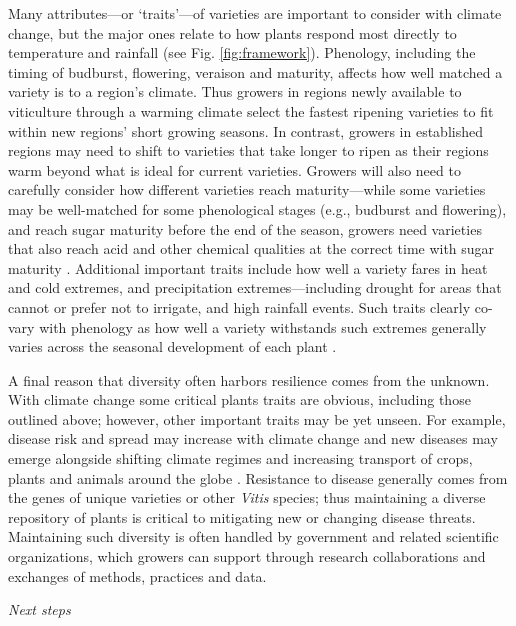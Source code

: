\documentclass[11pt,letterpaper]{article}
\begin{document}
Many attributes---or `traits'---of varieties are important to consider with climate change, but the major ones relate to how plants respond most directly to temperature and rainfall (see Fig. \ref{fig:framework}). Phenology, including the timing of budburst, flowering, veraison and maturity, affects how well matched a variety is to a region's climate. Thus growers in regions newly available to viticulture through a warming climate select the fastest ripening varieties to fit within new regions' short growing seasons. In contrast, growers in established regions may need to shift to varieties that take longer to ripen as their regions warm beyond what is ideal for current varieties. Growers will also need to carefully consider how different varieties reach maturity---while some varieties may be well-matched for some phenological stages (e.g., budburst and flowering), and reach sugar maturity before the end of the season, growers need varieties that also reach acid and other chemical qualities at the correct time with sugar maturity \citep{rienth2016,torregrosa2017,arriz2018}. Additional important traits include how well a variety fares in heat and cold extremes, and precipitation extremes---including drought for areas that cannot or prefer not to irrigate, and high rainfall events. Such traits clearly co-vary with phenology as how well a variety withstands such extremes generally varies across the seasonal development of each plant \citep[for examples see][]{petrie2005,greer2010}.

A final reason that diversity often harbors resilience comes from the unknown. With climate change some critical plants traits are obvious, including those outlined above; however, other important traits may be yet unseen. For example, disease risk and spread may increase with climate change and new diseases may emerge alongside shifting climate regimes and increasing transport of crops, plants and animals around the globe \citep{fisher2012}. Resistance to disease generally comes from the genes of unique varieties or other \emph{Vitis} species; thus maintaining a diverse repository of plants is critical to mitigating new or changing disease threats. Maintaining such diversity is often handled by government and related scientific organizations, which growers can support through research collaborations and exchanges of methods, practices and data. 

\emph{Next steps}
\end{document}
